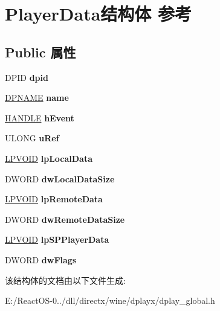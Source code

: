 \hypertarget{struct_player_data}{}\section{Player\+Data结构体 参考}
\label{struct_player_data}
\subsection*{Public 属性}
\begin{DoxyCompactItemize}
\item 
\mbox{\label{struct_player_data_ae91a1f81b1a4d2b0122a943dc22880d0}} 
D\+P\+ID {\bfseries dpid}
\item 
\mbox{\label{struct_player_data_a62c0576a491434128c1fa62980fb444c}} 
\hyperlink{structtag_d_p_n_a_m_e}{D\+P\+N\+A\+ME} {\bfseries name}
\item 
\mbox{\label{struct_player_data_ae00e0dba2ea06a07f6f955fa62d61777}} 
\hyperlink{interfacevoid}{H\+A\+N\+D\+LE} {\bfseries h\+Event}
\item 
\mbox{\label{struct_player_data_a3cdb9495a5ef9df48eef42dfe3c3dc54}} 
U\+L\+O\+NG {\bfseries u\+Ref}
\item 
\mbox{\label{struct_player_data_aa7e62805328037feedfa489c27c11413}} 
\hyperlink{interfacevoid}{L\+P\+V\+O\+ID} {\bfseries lp\+Local\+Data}
\item 
\mbox{\label{struct_player_data_a75f92c7e42b513efdc0b49d958f71bc8}} 
D\+W\+O\+RD {\bfseries dw\+Local\+Data\+Size}
\item 
\mbox{\label{struct_player_data_a91372256bee9bc802175849cb4b95160}} 
\hyperlink{interfacevoid}{L\+P\+V\+O\+ID} {\bfseries lp\+Remote\+Data}
\item 
\mbox{\label{struct_player_data_abc6e994b3a7daf70dde34718f289e441}} 
D\+W\+O\+RD {\bfseries dw\+Remote\+Data\+Size}
\item 
\mbox{\label{struct_player_data_a9e490346d03bf226016fa0d39ac66174}} 
\hyperlink{interfacevoid}{L\+P\+V\+O\+ID} {\bfseries lp\+S\+P\+Player\+Data}
\item 
\mbox{\label{struct_player_data_af873154c58c609bd907fb30a001d8a4e}} 
D\+W\+O\+RD {\bfseries dw\+Flags}
\end{DoxyCompactItemize}


该结构体的文档由以下文件生成\+:\begin{DoxyCompactItemize}
\item 
E\+:/\+React\+O\+S-\/0../dll/directx/wine/dplayx/dplay\+\_\+global.\+h\end{DoxyCompactItemize}
